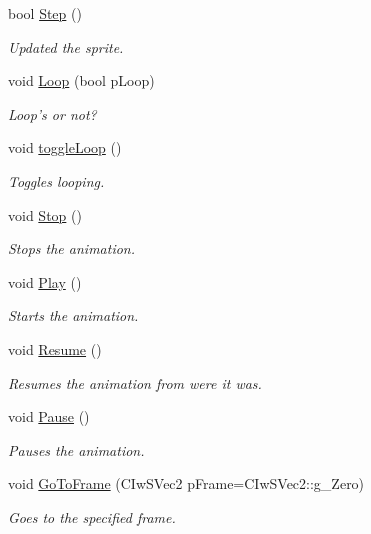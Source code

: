 \begin{DoxyCompactItemize}
bool \hyperlink{class_iw2_d_sprite_a039808be71b6fe20c020e1ee5d7e3f00}{Step} ()
\begin{DoxyCompactList}\small\item\em Updated the sprite. \end{DoxyCompactList}\item 
void \hyperlink{class_iw2_d_sprite_a54d1bacc7b988701df9ce9b5df9fd033}{Loop} (bool pLoop)
\begin{DoxyCompactList}\small\item\em Loop's or not? \end{DoxyCompactList}\item 
void \hyperlink{class_iw2_d_sprite_ad74adfd5ffbbba3041988ae0e30a4b68}{toggleLoop} ()
\begin{DoxyCompactList}\small\item\em Toggles looping. \end{DoxyCompactList}\item 
void \hyperlink{class_iw2_d_sprite_af46c9ecec08168e43f403cf720249a7c}{Stop} ()
\begin{DoxyCompactList}\small\item\em Stops the animation. \end{DoxyCompactList}\item 
void \hyperlink{class_iw2_d_sprite_a7b56cd9de960748403d7469e1614c09b}{Play} ()
\begin{DoxyCompactList}\small\item\em Starts the animation. \end{DoxyCompactList}\item 
void \hyperlink{class_iw2_d_sprite_a0759dd414a88ba342623b87cd61ecec0}{Resume} ()
\begin{DoxyCompactList}\small\item\em Resumes the animation from were it was. \end{DoxyCompactList}\item 
void \hyperlink{class_iw2_d_sprite_ae156b0f5a3f94e6787a2c42b3f8cf976}{Pause} ()
\begin{DoxyCompactList}\small\item\em Pauses the animation. \end{DoxyCompactList}\item 
void \hyperlink{class_iw2_d_sprite_adf293508fe0f9fce3e6f5a43aa97d258}{GoToFrame} (CIwSVec2 pFrame=CIwSVec2::g\_\-Zero)
\begin{DoxyCompactList}\small\item\em Goes to the specified frame. \end{DoxyCompactList}\item 

\end{DoxyCompactItemize}
